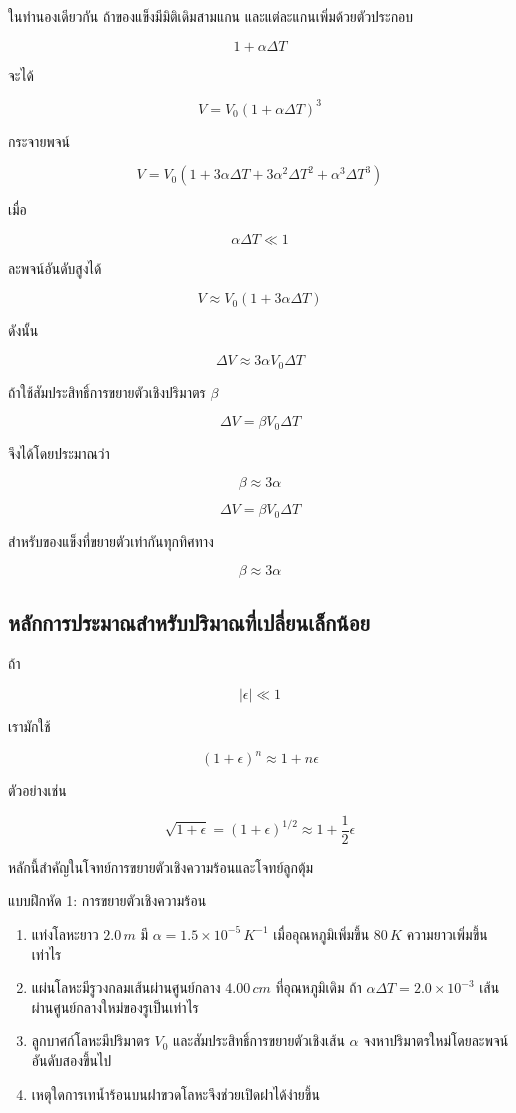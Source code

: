 ในทำนองเดียวกัน ถ้าของแข็งมีมิติเดิมสามแกน และแต่ละแกนเพิ่มด้วยตัวประกอบ

\[
1+\alpha\Delta T
\]

จะได้

\[
V=V_0(1+\alpha\Delta T)^3
\]

กระจายพจน์

\[
V=V_0\left(1+3\alpha\Delta T+3\alpha^2\Delta T^2+\alpha^3\Delta T^3\right)
\]

เมื่อ

\[
\alpha\Delta T\ll 1
\]

ละพจน์อันดับสูงได้

\[
V\approx V_0(1+3\alpha\Delta T)
\]

ดังนั้น

\[
\Delta V\approx 3\alpha V_0\Delta T
\]

ถ้าใช้สัมประสิทธิ์การขยายตัวเชิงปริมาตร $\beta$

\[
\Delta V=\beta V_0\Delta T
\]

จึงได้โดยประมาณว่า

\[
\beta\approx 3\alpha
\]

\begin{tcolorbox}[title=การขยายตัวเชิงปริมาตร]
\[
\boxed{\Delta V=\beta V_0\Delta T}
\]

สำหรับของแข็งที่ขยายตัวเท่ากันทุกทิศทาง

\[
\boxed{\beta\approx 3\alpha}
\]
\end{tcolorbox}

\subsection{หลักการประมาณสำหรับปริมาณที่เปลี่ยนเล็กน้อย}

ถ้า

\[
|\epsilon|\ll 1
\]

เรามักใช้

\[
(1+\epsilon)^n\approx 1+n\epsilon
\]

ตัวอย่างเช่น

\[
\sqrt{1+\epsilon}
=
(1+\epsilon)^{1/2}
\approx
1+\frac{1}{2}\epsilon
\]

หลักนี้สำคัญในโจทย์การขยายตัวเชิงความร้อนและโจทย์ลูกตุ้ม

\begin{exercisebox}{แบบฝึกหัด 1: การขยายตัวเชิงความร้อน}
\begin{enumerate}
    \item แท่งโลหะยาว $2.0\,\si{m}$ มี $\alpha=1.5\times10^{-5}\,\si{K^{-1}}$ เมื่ออุณหภูมิเพิ่มขึ้น $80\,\si{K}$ ความยาวเพิ่มขึ้นเท่าไร
    \item แผ่นโลหะมีรูวงกลมเส้นผ่านศูนย์กลาง $4.00\,\si{cm}$ ที่อุณหภูมิเดิม ถ้า $\alpha\Delta T=2.0\times10^{-3}$ เส้นผ่านศูนย์กลางใหม่ของรูเป็นเท่าไร
    \item ลูกบาศก์โลหะมีปริมาตร $V_0$ และสัมประสิทธิ์การขยายตัวเชิงเส้น $\alpha$ จงหาปริมาตรใหม่โดยละพจน์อันดับสองขึ้นไป
    \item เหตุใดการเทน้ำร้อนบนฝาขวดโลหะจึงช่วยเปิดฝาได้ง่ายขึ้น
\end{enumerate}
\end{exercisebox}

